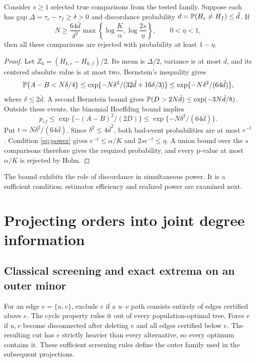 \documentclass[11pt]{article}
\theoremstyle{plain}
\theoremstyle{definition}\newtheorem{remark}{Remark}\newtheorem{example}{Example}
\begin{document}
\begin{proposition}\label{prop:power}
Consider $s\ge1$ selected true comparisons from the tested family. Suppose each has gap $\Delta=\tau_e-\tau_f\ge\delta>0$ and discordance probability $d=\mathbb P(H_e\ne H_f)\le\bar d$. If
\begin{equation}\label{eq:power}
 N\ge\frac{64\bar d}{\delta^2}\max\left\{\log\frac K\alpha,\log\frac{2s}\eta\right\},\qquad 0<\eta<1,
\end{equation}
then all these comparisons are rejected with probability at least $1-\eta$.
\end{proposition}
\begin{proof}
Let $Z_k=(H_{k,e}-H_{k,f})/2$. Its mean is $\Delta/2$, variance is at most $\bar d$, and its centered absolute value is at most two. Bernstein's inequality gives
\[
 \mathbb P\{A-B<N\delta/4\}
 \le \exp\{-N\delta^2/(32\bar d+16\delta/3)\}
 \le \exp\{-N\delta^2/(64\bar d)\},
\]
where $\delta\le2\bar d$. A second Bernstein bound gives $\mathbb P(D>2N\bar d)\le\exp(-3N\bar d/8)$. Outside these events, the binomial Hoeffding bound implies
\[
 p_{ef}\le\exp\{-(A-B)^2/(2D)\}\le\exp\{-N\delta^2/(64\bar d)\}.
\]
Put $t=N\delta^2/(64\bar d)$. Since $\delta^2\le4\bar d^2$, both bad-event probabilities are at most $e^{-t}$. Condition \eqref{eq:power} gives $e^{-t}\le\alpha/K$ and $2s e^{-t}\le\eta$. A union bound over the $s$ comparisons therefore gives the required probability, and every p-value at most $\alpha/K$ is rejected by Holm.
\end{proof}

The bound exhibits the role of discordance in simultaneous power. It is a sufficient condition; estimator efficiency and realized power are examined next.



\section{Projecting orders into joint degree information}\label{sec:minor}
\subsection{Classical screening and exact extrema on an outer minor}
For an edge $e=\{u,v\}$, exclude $e$ if a $u$--$v$ path consists entirely of edges certified above $e$. The cycle property rules it out of every population-optimal tree. Force $e$ if $u,v$ become disconnected after deleting $e$ and all edges certified below $e$. The resulting cut has $e$ strictly heavier than every alternative, so every optimum contains it. These sufficient screening rules define the outer family used in the subsequent projections.
\end{document}
